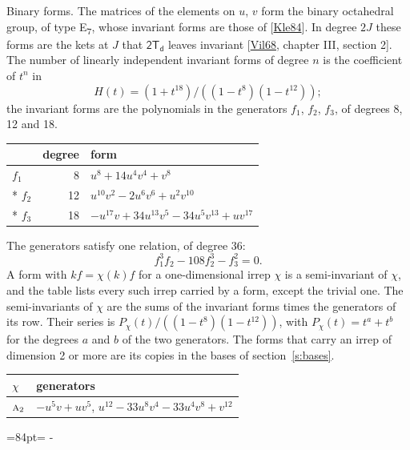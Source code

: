 \documentclass[10pt,a4paper]{article}
\makeatletter
\renewcommand\paragraph{\@startsection{paragraph}{4}{\z@}{1.5ex plus .5ex minus .2ex}{-1em}%
  {\normalfont\small\sffamily\bfseries\color{parttitle}}}
\newcommand{\needspace}[1]{\par\penalty-100\begingroup\dimen0=#1\relax\dimen2=\pagegoal
  \advance\dimen2-\pagetotal\ifdim\dimen0>\dimen2\relax\ifdim\dimen2>0pt\vfil\break\fi\fi
  \endgroup}
\numberwithin{equation}{section}
\newcommand{\grp}[1]{\mathsf{#1}}
\newcommand{\irr}[1]{\text{\normalfont\scshape #1}}
\makeatother
\begin{document}
\paragraph{Binary forms.}
The matrices of the elements on $u$, $v$ form the binary octahedral group, of type E\textsubscript{7}, whose invariant forms are those of [\href{../../../REFERENCES.pdf\#ref.Kle84}{Kle84}]. In degree $2J$ these forms are the kets at $J$ that $\grp{2T_{d}}$ leaves invariant [\href{../../../REFERENCES.pdf\#ref.Vil68}{Vil68}, chapter III, section 2]. \label{n:head.degree}\label{n:head.form}The number of linearly independent invariant forms of degree $n$ is the coefficient of $t^n$ in
\begin{equation}\label{e:molien}H(t) = (1 + t^{18})/((1-t^{8})(1-t^{12}));\end{equation}
the invariant forms are the polynomials in the generators $f_1$, $f_2$, $f_3$, of degrees 8, 12 and 18.
{\small\begin{longtable}{@{}lrl@{}}\toprule
& degree & form\\\midrule\endhead
\bottomrule\endfoot\endlastfoot
$f_{1}$ & 8 & $u^{8} + 14u^{4}v^{4} + v^{8}$\\*
$f_{2}$ & 12 & $u^{10}v^{2} - 2u^{6}v^{6} + u^{2}v^{10}$\\*
$f_{3}$ & 18 & $-u^{17}v + 34u^{13}v^{5} - 34u^{5}v^{13} + uv^{17}$\\
\bottomrule\end{longtable}}
The generators satisfy one relation, of degree 36:
\begin{equation}\label{e:relation}f_{1}^{3}f_{2} - 108f_{2}^{3} - f_{3}^{2} = 0.\end{equation}
A form with $k f = \chi(k) f$ for a one-dimensional irrep $\chi$ is a semi-invariant of $\chi$, and the table lists every such irrep carried by a form, except the trivial one. \label{n:head.generators}The semi-invariants of $\chi$ are the sums of the invariant forms times the generators of its row. Their series is $P_\chi(t)/((1-t^{8})(1-t^{12}))$, with $P_\chi(t) = t^{a} + t^{b}$ for the degrees $a$ and $b$ of the two generators. The forms that carry an irrep of dimension 2 or more are its copies in the bases of section~\ref{s:bases}.
{\small\begin{longtable}{@{}ll@{}}\toprule
$\chi$ & generators\\\midrule\endhead
\bottomrule\endfoot\endlastfoot
$\irr{a}_{2}$ & $-u^{5}v + uv^{5}$, $u^{12} - 33u^{8}v^{4} - 33u^{4}v^{8} + v^{12}$\\
\bottomrule\end{longtable}}
\needspace{84pt}
\end{document}
